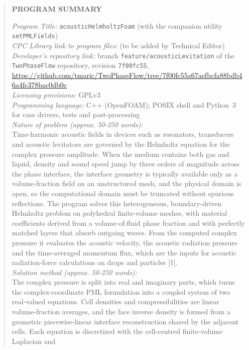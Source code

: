 \documentclass[final,12pt,nopreprintline]{elsarticle}
\newcommand{\code}[1]{\texttt{#1}}
\newcommand{\breakableurl}[1]{{\def\UrlBreaks{\do\/\do\-\do\.\do\_\do\a\do\b\do\c\do\d\do\e\do\f\do\0\do\1\do\2\do\3\do\4\do\5\do\6\do\7\do\8\do\9}\url{#1}}}
\begin{document}
\begin{frontmatter}
\begin{abstract}
\vspace{1ex}
\noindent\textbf{PROGRAM SUMMARY}

\begin{small}
\raggedright
\noindent
{\em Program Title:} \code{acousticHelmholtzFoam} (with the companion utility
\code{setPMLFields})\\
{\em CPC Library link to program files:} (to be added by Technical Editor)\\
{\em Developer's repository link:}
branch \code{feature/acousticLevitation} of the \code{TwoPhaseFlow}
repository, revision \code{7f00fc55},
\breakableurl{https://github.com/tmaric/TwoPhaseFlow/tree/7f00fc55a67aefbcfa88bdb46a4fc378bac0db0c}\\
{\em Licensing provisions:} GPLv3\\
{\em Programming language:} C++ (OpenFOAM); POSIX shell and Python~3 for case
drivers, tests and post-processing\\
{\em Nature of problem (approx. 50-250 words):}\\
Time-harmonic acoustic fields in devices such as resonators, transducers and
acoustic levitators are governed by the Helmholtz equation for the complex
pressure amplitude.  When the medium contains both gas and liquid, density and
sound speed jump by three orders of magnitude across the phase interface, the
interface geometry is typically available only as a volume-fraction field on an
unstructured mesh, and the physical domain is open, so the computational domain
must be truncated without spurious reflections.  The program solves this
heterogeneous, boundary-driven Helmholtz problem on polyhedral finite-volume
meshes, with material coefficients derived from a volume-of-fluid phase
fraction and with perfectly matched layers that absorb outgoing waves.  From the
computed complex pressure it evaluates the acoustic velocity, the acoustic
radiation pressure and the time-averaged momentum flux, which are the inputs for
acoustic radiation-force calculations on drops and particles [1].\\
{\em Solution method (approx. 50-250 words):}\\
The complex pressure is split into real and imaginary parts, which turns the
complex-coordinate PML formulation into a coupled system of two real-valued
equations.  Cell densities and compressibilities are linear volume-fraction
averages, and the face inverse density is formed from a geometric
piecewise-linear interface reconstruction shared by the adjacent cells.  Each
equation is discretized with the cell-centred finite-volume Laplacian and

\end{small}
\end{abstract}
\end{frontmatter}
\end{document}
